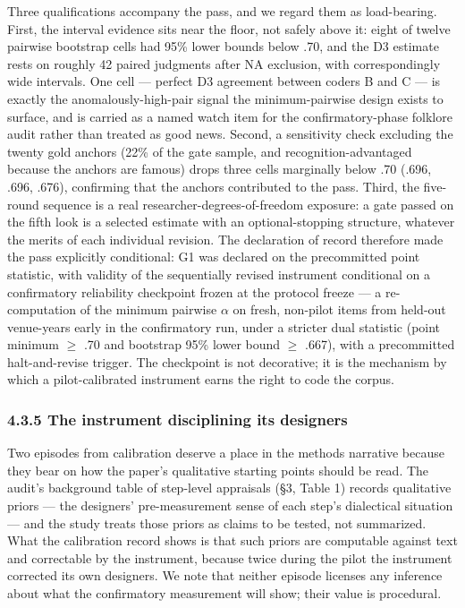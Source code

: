 Three qualifications accompany the pass, and we regard them as load-bearing. First, the interval evidence sits near the floor, not safely above it: eight of twelve pairwise bootstrap cells had 95\% lower bounds below .70, and the D3 estimate rests on roughly 42 paired judgments after NA exclusion, with correspondingly wide intervals. One cell --- perfect D3 agreement between coders B and C --- is exactly the anomalously-high-pair signal the minimum-pairwise design exists to surface, and is carried as a named watch item for the confirmatory-phase folklore audit rather than treated as good news. Second, a sensitivity check excluding the twenty gold anchors (22\% of the gate sample, and recognition-advantaged because the anchors are famous) drops three cells marginally below .70 (.696, .696, .676), confirming that the anchors contributed to the pass. Third, the five-round sequence is a real researcher-degrees-of-freedom exposure: a gate passed on the fifth look is a selected estimate with an optional-stopping structure, whatever the merits of each individual revision. The declaration of record therefore made the pass explicitly conditional: G1 was declared on the precommitted point statistic, with validity of the sequentially revised instrument conditional on a confirmatory reliability checkpoint frozen at the protocol freeze --- a re-computation of the minimum pairwise $\alpha$ on fresh, non-pilot items from held-out venue-years early in the confirmatory run, under a stricter dual statistic (point minimum $\ge$ .70 and bootstrap 95\% lower bound $\ge$ .667), with a precommitted halt-and-revise trigger. The checkpoint is not decorative; it is the mechanism by which a pilot-calibrated instrument earns the right to code the corpus.

\subsubsection{4.3.5 The instrument disciplining its designers}\label{the-instrument-disciplining-its-designers}

Two episodes from calibration deserve a place in the methods narrative because they bear on how the paper's qualitative starting points should be read. The audit's background table of step-level appraisals (\S{}3, Table 1) records qualitative priors --- the designers' pre-measurement sense of each step's dialectical situation --- and the study treats those priors as claims to be tested, not summarized. What the calibration record shows is that such priors are computable against text and correctable by the instrument, because twice during the pilot the instrument corrected its own designers. We note that neither episode licenses any inference about what the confirmatory measurement will show; their value is procedural.

